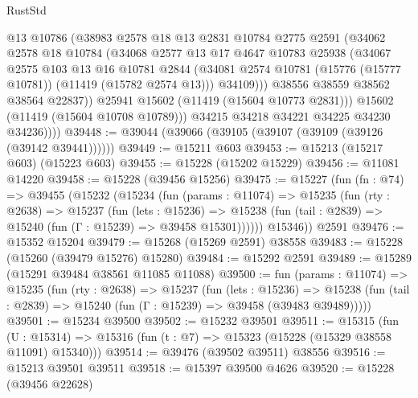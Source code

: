 \begin{lexlean}{RustStd}
\begin{coremodule}
                  @13
                  @10786
                  (@38983
                    @2578
                    @18
                    @13
                    @2831
                    @10784
                    @2775
                    @2591
                    (@34062
                      @2578
                      @18
                      @10784
                      (@34068
                        @2577
                        @13
                        @17
                        @4647
                        @10783
                        @25938
                        (@34067
                          @2575
                          @103
                          @13
                          @16
                          @10781
                          @2844
                          (@34081 @2574 @10781 (@15776 (@15777 @10781)) (@11419 (@15782 @2574 @13)))
                          @34109)))
                    @38556
                    @38559
                    @38562
                    @38564
                    @22837))
                @25941
                @15602
                (@11419 (@15604 @10773 @2831)))
              @15602
              (@11419 (@15604 @10708 @10789)))
            @34215
            @34218
            @34221
            @34225
            @34230
            @34236))))
@39448 := @39044 (@39066 (@39105 (@39107 (@39109 (@39126 (@39142 @39441))))))
@39449 := @15211 @603
@39453 := @15213 (@15217 @603) (@15223 @603)
@39455 := @15228 (@15202 @15229)
@39456 := @11081 @14220
@39458 := @15228 (@39456 @15256)
@39475 := @15227
    (fun (fn : @74) =>
    @39455
      (@15232
        (@15234
          (fun (params : @11074) =>
          @15235
            (fun (rty : @2638) =>
            @15237
              (fun (lets : @15236) =>
              @15238 (fun (tail : @2839) => @15240 (fun (Γ : @15239) => @39458 @15301))))))
        @15346))
    @2591
@39476 := @15352 @15204
@39479 := @15268 (@15269 @2591) @38558
@39483 := @15228 (@15260 (@39479 @15276) @15280)
@39484 := @15292 @2591
@39489 := @15289 (@15291 @39484 @38561 @11085 @11088)
@39500 := fun (params : @11074) =>
  @15235
    (fun (rty : @2638) =>
    @15237
      (fun (lets : @15236) =>
      @15238 (fun (tail : @2839) => @15240 (fun (Γ : @15239) => @39458 (@39483 @39489)))))
@39501 := @15234 @39500
@39502 := @15232 @39501
@39511 := @15315
    (fun (U : @15314) => @15316 (fun (t : @7) => @15323 (@15228 (@15329 @38558 @11091) @15340)))
@39514 := @39476 (@39502 @39511) @38556
@39516 := @15213 @39501 @39511
@39518 := @15397 @39500 @4626
@39520 := @15228 (@39456 @22628)

\end{coremodule}
\end{lexlean}
